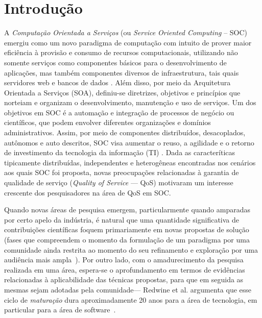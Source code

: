 
\section{Introdu\c{c}\~{a}o}\label{sec:introduction}

A \emph{Computa\c c\~{a}o Orientada a Servi\c cos} (ou \emph{Service Oriented Computing} -- SOC) emergiu como um novo paradigma de computa\c c\~{a}o com intuito de prover maior eficiência à provisão e consumo de recursos computacionais, utilizando não somente servi\c cos como componentes b\'{a}sicos para o desenvolvimento de aplica\c c\~{o}es, mas também componentes diversos de infraestrutura, tais quais servidores web e bancos de dados \cite{papazoglou:cacm2003} \cite{10.1109/MIC.2010.147}. Além disso, por meio da Arquitetura Orientada a Serviços (SOA), definiu-se diretrizes, objetivos e princípios que norteiam e organizam o desenvolvimento, manuten\c{c}\~{a}o e uso de serviços. Um dos objetivos em SOC \'{e} a automa\c c\~{a}o e integra\c c\~{a}o de processos de neg\'{o}cio ou cient\'{i}ficos, que podem envolver diferentes organiza\c c\~{o}es e domínios administrativos. Assim, por meio de componentes distribuídos, desacoplados, autônomos e auto descritos, SOC visa aumentar o reuso, a agilidade e o retorno 
de 
investimento da tecnologia da informação (TI) \cite{Erl:2007:SPS:1296147}. Dada as caracter\'{i}ticas tipicamente distribu\'{i}das, independentes e heterog\^{e}neas encontradas nos cen\'{a}rios aos quais SOC foi proposta, novas preocupa\c c\~{o}es relacionadas \`{a} garantia de qualidade de servi\c co (\emph{Quality of Service} --- QoS) motivaram um interesse crescente dos pesquisadores na \'{a}rea de QoS em SOC.







Quando novas \'{a}reas de pesquisa emergem, particularmente quando amparadas por certo apelo da ind\'{u}stria, \'{e} natural que uma quantidade significativa de contribui\c c\~{o}es cient\'{i}ficas foquem primariamente em novas propostas de solu\c c\~{a}o (fases que compreendem o momento da formula\c c\~{a}o de um paradigma por uma comunidade ainda restrita ao momento do seu refinamento e explora\c c\~{a}o por uma audi\^{e}ncia mais ampla~\cite{redwine:icse1985}). Por outro lado, com o amadurecimento da pesquisa realizada em uma \'{a}rea, espera-se o aprofundamento em termos de evid\^{e}ncias relacionadas \`{a} aplicabilidade das t\'{e}cnicas propostas, para que em seguida as mesmas sejam adotadas pela comunidade--- Redwine et al. argumenta que esse ciclo de \emph{matura\c c\~{a}o} dura aproximadamente 20 anos para a \'{a}rea de tecnologia, em particular para a \'{a}rea de software~\cite{redwine:icse1985}.

